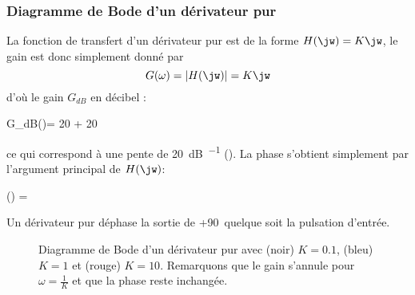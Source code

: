 \subsubsection{Diagramme de Bode d'un dérivateur pur}
La fonction de transfert d'un dérivateur pur est de la forme $H(\jw)=K\jw$,
le gain est donc simplement donné par 
\[
G(\omega)=|H(\jw)|=K\jw
\] 
d'où le gain $G_{dB}$ en décibel :
\begin{bequation}
    G_{dB}(\omega)= 20 + 20\log{\omega}
\end{bequation}
ce qui correspond à une pente de \SI{+20}{\dB\per\dec} ().
La phase s'obtient simplement par l'argument principal de $H(\jw)$:
\begin{bequation}
    \phi(\omega) = 
\end{bequation}
Un dérivateur pur déphase la sortie de +90\degree~quelque soit la pulsation 
d'entrée.
\begin{figure}[!htb]
    \centering
    

    
    \caption{Diagramme de Bode d'un dérivateur pur 
             avec (noir) $K=0.1$, (bleu) $K=1$ et (rouge) $K=10$. Remarquons 
             que le gain s'annule pour $\omega=\frac{1}{K}$ et que la phase 
             reste inchangée.\label{fig-bode_deriv}}
\end{figure}
\newpage
